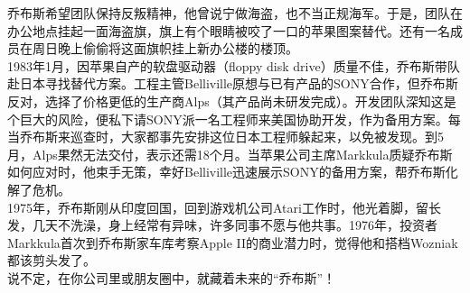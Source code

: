 乔布斯希望团队保持反叛精神，他曾说宁做海盗，也不当正规海军。于是，团队在办公地点挂起一面海盗旗，旗上有个眼睛被咬了一口的苹果图案替代。还有一名成员在周日晚上偷偷将这面旗帜挂上新办公楼的楼顶。\\
1983年1月，因苹果自产的软盘驱动器（floppy disk
drive）质量不佳，乔布斯带队赴日本寻找替代方案。工程主管Belliville原想与已有产品的SONY合作，但乔布斯反对，选择了价格更低的生产商Alps（其产品尚未研发完成）。开发团队深知这是个巨大的风险，便私下请SONY派一名工程师来美国协助开发，作为备用方案。每当乔布斯来巡查时，大家都事先安排这位日本工程师躲起来，以免被发现。到5月，Alps果然无法交付，表示还需18个月。当苹果公司主席Markkula质疑乔布斯如何应对时，他束手无策，幸好Belliville迅速展示SONY的备用方案，帮乔布斯化解了危机。\\
1975年，乔布斯刚从印度回国，回到游戏机公司Atari工作时，他光着脚，留长发，几天不洗澡，身上经常有异味，许多同事不愿与他共事。1976年，投资者Markkula首次到乔布斯家车库考察Apple
II的商业潜力时，觉得他和搭档Wozniak都该剪头发了。\\
说不定，在你公司里或朋友圈中，就藏着未来的``乔布斯''！

\begin{description}
\item[]
\end{description}



